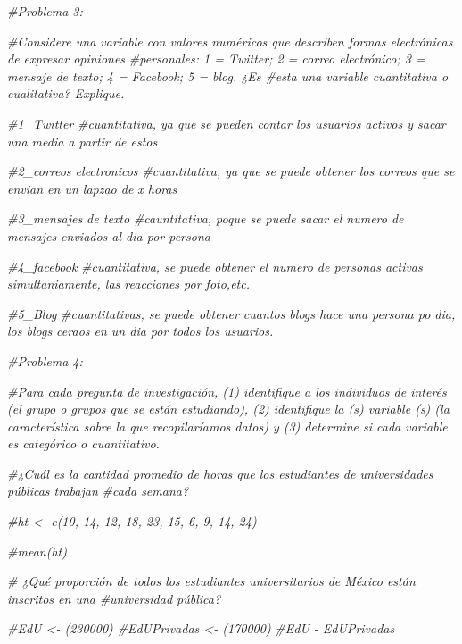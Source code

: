 \documentclass[
]{article}
\newenvironment{Shaded}{\begin{snugshade}}{\end{snugshade}}
\newcommand{\CommentTok}[1]{\textcolor[rgb]{0.56,0.35,0.01}{\textit{#1}}}
\begin{document}
\begin{Shaded}
\begin{Highlighting}[]
\CommentTok{\#Problema 3:}

\CommentTok{\#Considere una variable con valores numéricos que describen formas electrónicas de expresar opiniones}
\CommentTok{\#personales: 1 = Twitter; 2 = correo electrónico; 3 = mensaje de texto; 4 = Facebook; 5 = blog. ¿Es}
\CommentTok{\#esta una variable cuantitativa o cualitativa? Explique.}

\CommentTok{\#1\_Twitter}
\CommentTok{\#cuantitativa, ya que se pueden contar los usuarios activos y sacar una media a partir de estos}

\CommentTok{\#2\_correos electronicos}
\CommentTok{\#cuantitativa, ya que se puede obtener los correos que se envian en un lapzao de x horas}

\CommentTok{\#3\_mensajes de texto}
\CommentTok{\#cauntitativa, poque se puede sacar el numero de mensajes enviados al dia por persona }

\CommentTok{\#4\_facebook}
\CommentTok{\#cuantitativa, se puede obtener el numero de personas activas simultaniamente, las reacciones por foto,etc.}

\CommentTok{\#5\_Blog}
\CommentTok{\#cuantitativas, se puede obtener cuantos blogs hace una persona po dia, los blogs ceraos en un dia por todos los usuarios.}

\CommentTok{\#Problema 4:}

  \CommentTok{\#Para cada pregunta de investigación, (1) identifique a los individuos de interés (el grupo o grupos que                                                                           se están estudiando), (2) identifique la (s) variable (s) (la característica sobre la que recopilaríamos                                                                                                                                               datos) y (3) determine si cada variable es categórico o cuantitativo.}

\CommentTok{\#¿Cuál es la cantidad promedio de horas que los estudiantes de universidades públicas trabajan}
\CommentTok{\#cada semana? }

\CommentTok{\#ht \textless{}{-} c(10, 14, 12, 18, 23, 15, 6, 9, 14, 24)}

\CommentTok{\#mean(ht)}

 \CommentTok{\# ¿Qué proporción de todos los estudiantes universitarios de México están inscritos en una}
\CommentTok{\#universidad pública?}

\CommentTok{\#EdU \textless{}{-} (230000)}
\CommentTok{\#EdUPrivadas \textless{}{-} (170000)}
\CommentTok{\#EdU {-} EdUPrivadas}



\end{Highlighting}
\end{Shaded}
\end{document}

